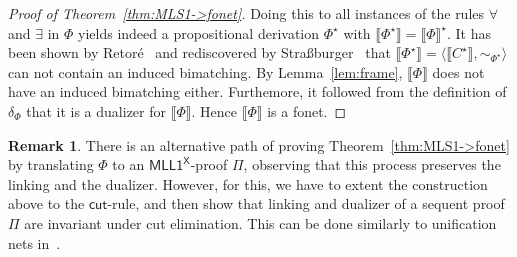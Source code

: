 \documentclass[conference,twosided,10pt]{IEEEtran}
\newcommand{\todo}[1]{{\color{red}     \noindent[\![\![{\bf TODO: }#1]\!]\!]}}
\newtheorem{thm}{Theorem}%
\theoremstyle{definition}
\newtheorem{remark}[thm]{Remark}
\newcommand{\fequ}{\equiv}
\newcommand{\Deri}{\Phi}
\newcommand*{\FOMLL}{\mathsf{MLL1^X}}
\newcommand*{\FOMLS}{\mathsf{MLS1^X}}
\newcommand{\cut}{\mathsf{cut}}
\newcommand{\mix}{\mathsf{mix}}
\newcommand\aiD {\mathsf{ai}}
\newcommand\tttD {\ttt}
\newcommand{\tuple}[1]{\langle#1\rangle}
\newcommand{\rectif}[1]{\widehat{#1}}
\newcommand{\fographof}[1]{\llbracket#1\rrbracket}
\newcommand{\graphof}[1]{\llbracket#1\rrbracket}
\newcommand{\frameof}[1]{#1^\star}
\newcommand{\substof}[1]{\sigma_{\!#1}}
\newcommand{\dsubstof}[1]{\delta_{#1}}
\newcommand{\linkingof}[1]{\sim_{#1}}
\begin{document}
\begin{proof}[Proof of Theorem~\ref{thm:MLS1->fonet}]
  Doing this to all instances of the rules $\forall$ and $\exists$ in
  $\Deri$ yields indeed a propositional derivation $\frameof\Deri$
  with
  \hbox{$\fographof{\frameof\Deri}=\frameof{\fographof\Deri}$}. It has
  been shown by Retor\'e~\cite{some tech-report to be found} and
  rediscovered by Stra{\ss}burger~\cite{dissvonlutz} that
  $\fographof{\frameof\Deri}=\tuple{\graphof{\frameof
      C},\linkingof{\frameof\Deri}}$ can not contain an induced
  bimatching. By Lemma~\ref{lem:frame}, $\fographof{\Deri}$ does not
  have an induced bimatching either. Furthemore, it followed from the
  definition of $\dsubstof\Deri$ that it is a dualizer for
  $\fographof{\Deri}$. Hence $\fographof{\Deri}$ is a fonet.
\end{proof}

\begin{remark}
  There is an alternative path of proving Theorem~\ref{thm:MLS1->fonet}
  by translating $\Deri$ to an $\FOMLL$-proof $\Pi$, observing that
  this process preserves the linking and the dualizer. However, for
  this, we have to extent the construction above to the $\cut$-rule,
  and then show that linking and dualizer of a sequent proof $\Pi$ are
  invariant under cut elimination. This can be done similarly to
  unification nets in~\cite{hughes:unifn}.
\end{remark}


\end{document}
